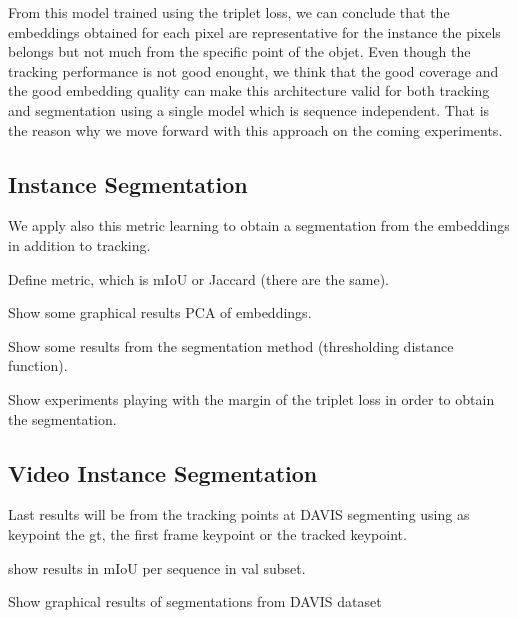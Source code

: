 From this model trained using the triplet loss, we can conclude that the embeddings obtained for each pixel are representative for the instance the pixels belongs but not much from the specific point of the objet.
Even though the tracking performance is not good enought, we think that the good coverage and the good embedding quality can make this architecture valid for both tracking and segmentation using a single model which is sequence independent.
That is the reason why we move forward with this approach on the coming experiments.



\subsection{Instance Segmentation}

We apply also this metric learning to obtain a segmentation from the embeddings in addition to tracking.

Define metric, which is mIoU or Jaccard (there are the same).

Show some graphical results PCA of embeddings.

Show some results from the segmentation method (thresholding distance function).

Show experiments playing with the margin of the triplet loss in order to obtain the segmentation.



\subsection{Video Instance Segmentation}


Last results will be from the tracking points at DAVIS segmenting using as keypoint the gt, the first frame keypoint or the tracked keypoint.

show results in mIoU per sequence in val subset.

Show graphical results of segmentations from DAVIS dataset
